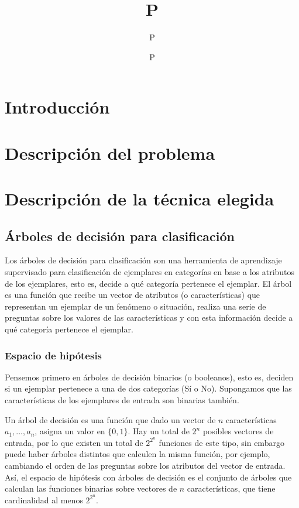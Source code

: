 \documentclass[spanish,11pt,letterpaper]{article}
\title{P}
\author{P}
\affil{P}
\date{P}
\begin{document}
\maketitle

\section{Introducción}

\section{Descripción del problema}

\section{Descripción de la técnica elegida}

\subsection{Árboles de decisión para clasificación}

Los árboles de decisión para clasificación son una herramienta de aprendizaje
supervisado para clasificación de ejemplares en categorías en base a los
atributos de los ejemplares, esto es, decide a qué categoría pertenece el
ejemplar. El árbol es una función que recibe un vector de atributos (o características) que
representan un ejemplar de un fenómeno o situación, realiza una serie de
preguntas sobre los valores de las características y con esta información
decide a qué categoría pertenece el ejemplar.

\subsubsection{Espacio de hipótesis}

Pensemos primero en árboles de decisión binarios (o booleanos), esto es, deciden si un ejemplar
pertenece a una de dos categorías (Sí o No). Supongamos que las características
de los ejemplares de entrada son binarias también.

Un árbol de decisión es una
función que dado un vector de $n$ características $a_1,\ldots,a_n$,
asigna un valor en $\{0,1\}$. Hay un total de $2^n$ posibles vectores de entrada,
por lo que existen un total de $2^{2^n}$ funciones de este tipo, sin embargo puede
haber árboles distintos que calculen la misma función, por ejemplo, cambiando el
orden de las preguntas sobre los atributos del vector de entrada. Así, el
espacio de hipótesis con árboles de decisión es el conjunto de árboles que calculan
las funciones binarias sobre vectores de $n$ características, que tiene cardinalidad
al menos $2^{2^n}$.
\end{document}
